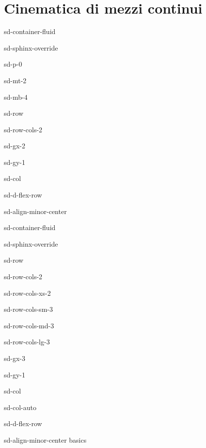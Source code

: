 \documentclass[letterpaper,10pt,english]{jupyterBook}
\begin{document}
\section{Cinematica di mezzi continui}
\label{\detokenize{ch/kinematics-continuum:cinematica-di-mezzi-continui}}\label{\detokenize{ch/kinematics-continuum:classical-mechanics-kinematics-contiuum}}\label{\detokenize{ch/kinematics-continuum::doc}}
\sphinxstepscope

\begin{sphinxuseclass}{sd-container-fluid}
\begin{sphinxuseclass}{sd-sphinx-override}
\begin{sphinxuseclass}{sd-p-0}
\begin{sphinxuseclass}{sd-mt-2}
\begin{sphinxuseclass}{sd-mb-4}
\begin{sphinxuseclass}{sd-row}
\begin{sphinxuseclass}{sd-row-cols-2}
\begin{sphinxuseclass}{sd-gx-2}
\begin{sphinxuseclass}{sd-gy-1}
\begin{sphinxuseclass}{sd-col}
\begin{sphinxuseclass}{sd-d-flex-row}
\begin{sphinxuseclass}{sd-align-minor-center}
\begin{sphinxuseclass}{sd-container-fluid}
\begin{sphinxuseclass}{sd-sphinx-override}
\begin{sphinxuseclass}{sd-row}
\begin{sphinxuseclass}{sd-row-cols-2}
\begin{sphinxuseclass}{sd-row-cols-xs-2}
\begin{sphinxuseclass}{sd-row-cols-sm-3}
\begin{sphinxuseclass}{sd-row-cols-md-3}
\begin{sphinxuseclass}{sd-row-cols-lg-3}
\begin{sphinxuseclass}{sd-gx-3}
\begin{sphinxuseclass}{sd-gy-1}
\begin{sphinxuseclass}{sd-col}
\begin{sphinxuseclass}{sd-col-auto}
\begin{sphinxuseclass}{sd-d-flex-row}
\begin{sphinxuseclass}{sd-align-minor-center}
\sphinxAtStartPar
basics


\end{sphinxuseclass}
\end{sphinxuseclass}
\end{sphinxuseclass}
\end{sphinxuseclass}
\end{sphinxuseclass}
\end{sphinxuseclass}
\end{sphinxuseclass}
\end{sphinxuseclass}
\end{sphinxuseclass}
\end{sphinxuseclass}
\end{sphinxuseclass}
\end{sphinxuseclass}
\end{sphinxuseclass}
\end{sphinxuseclass}
\end{sphinxuseclass}
\end{sphinxuseclass}
\end{sphinxuseclass}
\end{sphinxuseclass}
\end{sphinxuseclass}
\end{sphinxuseclass}
\end{sphinxuseclass}
\end{sphinxuseclass}
\end{sphinxuseclass}
\end{sphinxuseclass}
\end{sphinxuseclass}
\end{sphinxuseclass}
\end{document}
